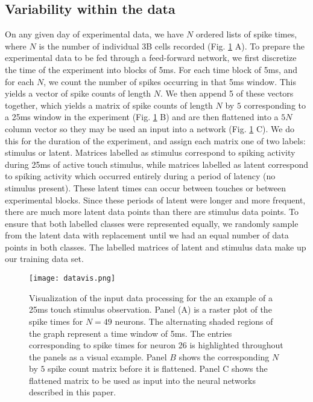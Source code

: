 \documentclass[12pt]{article}
\begin{document}
\subsection{Variability within the data}
\indent On any given day of experimental data, we have $N$ ordered lists of spike times, where $N$ is the number of individual 3B cells recorded (Fig. \ref{fig:datavis} A). To prepare the experimental data to be fed through a feed-forward network, we first discretize the time of the experiment into blocks of 5ms. For each time block of 5ms, and for each $N$, we count the number of spikes occurring in that 5ms window. This yields a vector of spike counts of length $N$. We then append 5 of these vectors together, which yields a matrix of spike counts of length $N$ by $5$  corresponding to a 25ms window in the experiment (Fig. \ref{fig:datavis} B) and are then flattened into a $5N$ column vector so they may be used an input into a network (Fig. \ref{fig:datavis} C). We do this for the duration of the experiment, and assign each matrix one of two labels: stimulus or latent. Matrices labelled as stimulus correspond to spiking activity during 25ms of active touch stimulus, while matrices labelled as latent correspond to spiking activity which occurred entirely during a period of latency (no stimulus present). These latent times can occur between touches or between experimental blocks. Since these periods of latent were longer and more frequent, there are much more latent data points than there are stimulus data points. To ensure that both labelled classes were represented equally, we randomly sample from the latent data with replacement until we had an equal number of data points in both classes. The labelled matrices of latent and stimulus data make up our training data set. \\
\begin{figure}
  \centering
  \texttt{[image: datavis.png]}
  \caption{Visualization of the input data processing for the an example of a 25ms touch stimulus observation. Panel (A) is a raster plot of the spike times for $N=49$ neurons. The alternating shaded regions of the graph represent a time window of 5ms. The entries corresponding to spike times for neuron 26 is highlighted throughout the panels as a visual example. Panel $B$ shows the corresponding $N$ by $5$ spike count matrix before it is flattened. Panel C shows the flattened matrix to be used as input into the neural networks described in this paper. }
  \label{fig:datavis}
\end{figure}
\end{document}
